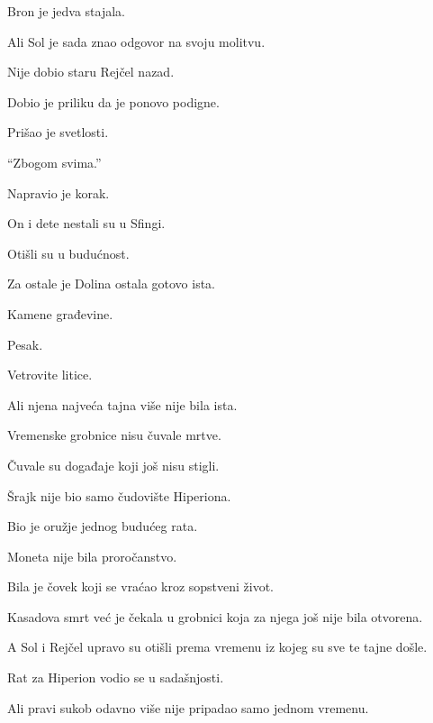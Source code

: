 Bron je jedva stajala.

\bigskip

Ali Sol je sada znao odgovor na svoju molitvu.

\bigskip

Nije dobio staru Rejčel nazad.

Dobio je priliku da je ponovo podigne.

\bigskip

Prišao je svetlosti.

\bigskip

``Zbogom svima.''

\bigskip

Napravio je korak.

\bigskip

On i dete nestali su u Sfingi.

\bigskip

Otišli su u budućnost.

\bigskip

Za ostale je Dolina ostala gotovo ista.

Kamene građevine.

Pesak.

Vetrovite litice.

\bigskip

Ali njena najveća tajna više nije bila ista.

\bigskip

Vremenske grobnice nisu čuvale mrtve.

\bigskip

Čuvale su događaje koji još nisu stigli.

\bigskip

Šrajk nije bio samo čudovište Hiperiona.

Bio je oružje jednog budućeg rata.

\bigskip

Moneta nije bila proročanstvo.

Bila je čovek koji se vraćao kroz sopstveni život.

\bigskip

Kasadova smrt već je čekala u grobnici koja za njega još nije bila otvorena.

\bigskip

A Sol i Rejčel upravo su otišli prema vremenu iz kojeg su sve te tajne došle.

\bigskip

Rat za Hiperion vodio se u sadašnjosti.

Ali pravi sukob odavno više nije pripadao samo jednom vremenu.